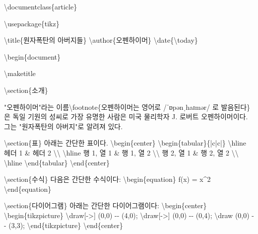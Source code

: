 \documentclass[
  letterpaper,
]{book}
\newenvironment{Shaded}{\begin{snugshade}}{\end{snugshade}}
\newcommand{\BuiltInTok}[1]{\textcolor[rgb]{0.00,0.23,0.31}{#1}}
\newcommand{\ExtensionTok}[1]{\textcolor[rgb]{0.00,0.23,0.31}{#1}}
\newcommand{\FunctionTok}[1]{\textcolor[rgb]{0.28,0.35,0.67}{#1}}
\newcommand{\KeywordTok}[1]{\textcolor[rgb]{0.00,0.23,0.31}{#1}}
\newcommand{\NormalTok}[1]{\textcolor[rgb]{0.00,0.23,0.31}{#1}}
\newcommand{\OperatorTok}[1]{\textcolor[rgb]{0.37,0.37,0.37}{#1}}
\newcommand{\SpecialStringTok}[1]{\textcolor[rgb]{0.13,0.47,0.30}{#1}}
\begin{document}
\begin{Shaded}
\begin{Highlighting}[]
\BuiltInTok{\textbackslash{}documentclass}\NormalTok{\{}\ExtensionTok{article}\NormalTok{\}}

\BuiltInTok{\textbackslash{}usepackage}\NormalTok{\{}\ExtensionTok{tikz}\NormalTok{\}}

\FunctionTok{\textbackslash{}title}\NormalTok{\{원자폭탄의 아버지들\}}
\FunctionTok{\textbackslash{}author}\NormalTok{\{오펜하이머\}}
\FunctionTok{\textbackslash{}date}\NormalTok{\{}\FunctionTok{\textbackslash{}today}\NormalTok{\}}

\KeywordTok{\textbackslash{}begin}\NormalTok{\{}\ExtensionTok{document}\NormalTok{\}}

\FunctionTok{\textbackslash{}maketitle}

\KeywordTok{\textbackslash{}section}\NormalTok{\{소개\}}

\NormalTok{"오펜하이머"라는 이름}\FunctionTok{\textbackslash{}footnote}\NormalTok{\{오펜하이머는 영어로 /ˈɒpənˌhaɪmər/ 로 발음된다\}은 독일 기원의 성씨로 가장 유명한 사람은 미국 물리학자 J. 로버트 오펜하이머이다. 그는 "원자폭탄의 아버지"로 알려져 있다.}

\KeywordTok{\textbackslash{}section}\NormalTok{\{표\}}
\NormalTok{아래는 간단한 표이다.}
\KeywordTok{\textbackslash{}begin}\NormalTok{\{}\ExtensionTok{center}\NormalTok{\}}
\KeywordTok{\textbackslash{}begin}\NormalTok{\{}\ExtensionTok{tabular}\NormalTok{\}\{|c|c|\}}
\FunctionTok{\textbackslash{}hline}
\NormalTok{헤더 1 }\OperatorTok{\&}\NormalTok{ 헤더 2 }\FunctionTok{\textbackslash{}\textbackslash{}}
\FunctionTok{\textbackslash{}hline}
\NormalTok{행 1, 열 1 }\OperatorTok{\&}\NormalTok{ 행 1, 열 2 }\FunctionTok{\textbackslash{}\textbackslash{}}
\NormalTok{행 2, 열 1 }\OperatorTok{\&}\NormalTok{ 행 2, 열 2 }\FunctionTok{\textbackslash{}\textbackslash{}}
\FunctionTok{\textbackslash{}hline}
\KeywordTok{\textbackslash{}end}\NormalTok{\{}\ExtensionTok{tabular}\NormalTok{\}}
\KeywordTok{\textbackslash{}end}\NormalTok{\{}\ExtensionTok{center}\NormalTok{\}}

\KeywordTok{\textbackslash{}section}\NormalTok{\{수식\}}
\NormalTok{다음은 간단한 수식이다:}
\KeywordTok{\textbackslash{}begin}\NormalTok{\{}\ExtensionTok{equation}\NormalTok{\}}
\SpecialStringTok{  f(x) = x\^{}2}
\KeywordTok{\textbackslash{}end}\NormalTok{\{}\ExtensionTok{equation}\NormalTok{\}}

\KeywordTok{\textbackslash{}section}\NormalTok{\{다이어그램\}}
\NormalTok{아래는 간단한 다이어그램이다:}
\KeywordTok{\textbackslash{}begin}\NormalTok{\{}\ExtensionTok{center}\NormalTok{\}}
\KeywordTok{\textbackslash{}begin}\NormalTok{\{}\ExtensionTok{tikzpicture}\NormalTok{\}}
  \FunctionTok{\textbackslash{}draw}\NormalTok{[{-}\textgreater{}] (0,0) {-}{-} (4,0);}
  \FunctionTok{\textbackslash{}draw}\NormalTok{[{-}\textgreater{}] (0,0) {-}{-} (0,4);}
  \FunctionTok{\textbackslash{}draw}\NormalTok{ (0,0) {-}{-} (3,3);}
\KeywordTok{\textbackslash{}end}\NormalTok{\{}\ExtensionTok{tikzpicture}\NormalTok{\}}
\KeywordTok{\textbackslash{}end}\NormalTok{\{}\ExtensionTok{center}\NormalTok{\}}


\end{Highlighting}
\end{Shaded}
\end{document}
